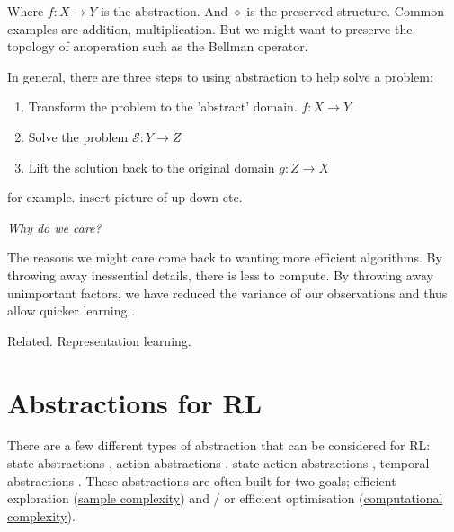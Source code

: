 Where $f: X\to Y$ is the abstraction. And $\diamond$ is the preserved structure.
Common examples are addition, multiplication. But we might want to preserve the topology of anoperation such as the Bellman operator.

In general, there are three steps to using abstraction to help solve a problem:

\begin{enumerate}
\tightlist
  \item Transform the problem to the 'abstract' domain. $f: X\to Y$
  \item Solve the problem $\mathcal S: Y \to Z$
  \item Lift the solution back to the original domain  $g:Z \to X$
\end{enumerate}

for example.
insert picture of up down etc.

\begin{displayquote}
 \textit{Why do we care?}
\end{displayquote}

The reasons we might care come back to wanting more efficient algorithms.
By throwing away inessential details, there is less to compute.
By throwing away unimportant factors, we have reduced the variance of our
observations and thus allow quicker learning \cite{Allen-Zhu2016a,Johnson2013a}.

%

{\color{red}Related. Representation learning.}

\section{Abstractions for RL}


There are a few different types of abstraction that can be considered for RL:
state abstractions \cite{Anand2019, Littman2006,Haarnoja,Cuccu2018,Zhonga,Vezzani2019,Abel2018,Duan2018,Abel2017,Silver2016a},
action abstractions \cite{Chandak2019,Bester2019,Tennenholtz2019,Nagabandi2019}, state-action abstractions \cite{Dayan1993,Barreto2017}, temporal abstractions \cite{Christodoulou2019, Rafati,Mankowitz2018,Harutyunyan2017,Fruit2017,Riemer2018,Bacon2018,Achiam2018,Pham2019,Konidaris2018,Haarnoja,Sutton1999,Fruit2017a,Bacon2016a,Jinnai2018,Nachum2018}.
These abstractions are often built for two goals; efficient exploration
(\href{https://en.wikipedia.org/wiki/Sample_complexity}{sample complexity})
and / or efficient optimisation (\href{https://en.wikipedia.org/wiki/Computational_complexity_theory}{computational complexity}).

